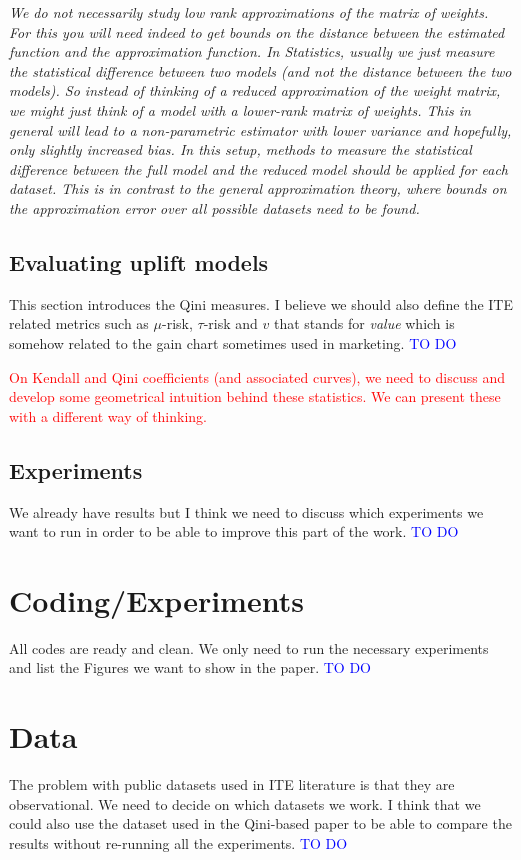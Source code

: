 \documentclass{article}
\begin{document}
\textit{We do not necessarily study low rank approximations of the matrix of weights. For this you will need indeed to get bounds on the distance between the estimated function and the approximation function. In Statistics, usually we just measure the statistical difference between two models (and not the distance between the two models). So instead of thinking of a reduced approximation of the weight matrix, we might just think of a model with a lower-rank matrix of weights. This in general will lead to a non-parametric estimator with lower variance and hopefully, only slightly increased bias. In this setup, methods to measure the statistical difference between the full model and the reduced model should be applied for each dataset. This is in contrast to the general approximation theory, where bounds on the approximation error over all possible datasets need to be found.}

\subsection{Evaluating uplift models}

This section introduces the Qini measures. I believe we should also define the ITE related metrics such as $\mu$-risk, $\tau$-risk and $v$ that stands for {\it value} which is somehow related to the gain chart sometimes used in marketing. \textcolor{blue}{TO DO} 

\textcolor{red}{On Kendall and Qini coefficients (and associated curves), we need to discuss and develop some geometrical intuition behind these statistics. We can present these with a different way of thinking.}

\subsection{Experiments}

We already have results but I think we need to discuss which experiments we want to run in order to be able to improve this part of the work. \textcolor{blue}{TO DO}


\section{Coding/Experiments}

All codes are ready and clean. We only need to run the necessary experiments and list the Figures we want to show in the paper. \textcolor{blue}{TO DO}

\section{Data}

The problem with public datasets used in ITE literature is that they are observational. We need to decide on which datasets we work. I think that we could also use the dataset used in the Qini-based paper to be able to compare the results without re-running all the experiments. \textcolor{blue}{TO DO}
\end{document}
